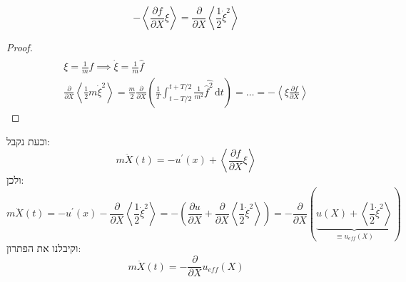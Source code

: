 \documentclass{tstextbook}
\begin{document}
\begin{proposition}
$$-\left\langle\frac{\partial f}{\partial X}\xi\right\rangle=\frac{\partial}{\partial X}\left\langle\frac{1}{2}\dot{\xi}^{2}\right\rangle$$

\end{proposition}
\begin{proof}
$$\begin{gather}\xi=\frac{1}{m}\hat{\hat{f}}\implies \dot{\xi}=\frac{1}{m}\hat{f} \\\frac{\partial }{\partial X}\left\langle  \frac{1}{2}m\dot{\xi}^2 \right\rangle =\frac{m}{2}\frac{\partial }{\partial X}\left( \frac{1}{T}\int_{t- T / 2}^{t+T / 2} \frac{1}{m^2}\hat{\hat{f}^2 } \, \mathrm{d}t  \right)=\dots=-\left\langle  \xi \frac{\partial f}{\partial X} \right\rangle 
\end{gather}$$

\end{proof}
וכעת נקבל:
$$m\ddot{X}\left(t\right)=-u^{\prime}\left(x\right)+\left\langle\frac{\partial f}{\partial X}\xi\right\rangle$$
ולכן:
$${{m{\ddot{X}}\left(t\right)=-u^{\prime}\left(x\right)-{\frac{\partial}{\partial X}}\left\langle{\frac{1}{2}}{\dot{\xi}}^{2}\right\rangle=-\left({\frac{\partial u}{\partial X}}+{\frac{\partial}{\partial X}}\left\langle{\frac{1}{2}}{\dot{\xi}}^{2}\right\rangle\right)=-{\frac{\partial}{\partial X}}\left(\underbrace{u\left(X\right)+\left\langle{\frac{1}{2}}{\dot{\xi}}^{2}\right\rangle}_{\equiv u_{eff}\left(X\right)}\right)}}$$
וקיבלנו את הפתרון:
$$m\ddot{X}\left(t\right)=-\frac{\partial}{\partial X}u_{e f f}\left(X\right)$$
\end{document}
